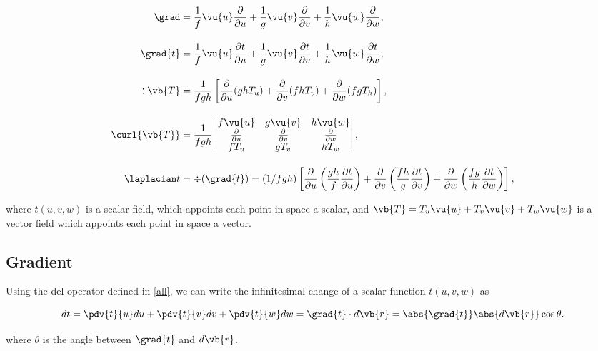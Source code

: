 \documentclass[english,a4paper,12pt]{report}
\begin{document}
\begin{equation} \label{all} 
\begin{aligned}
\grad &= \frac{1}{f}\vu{u}\frac{\partial}{\partial u} + \frac{1}{g}\vu{v}\frac{\partial}{\partial v} + \frac{1}{h}\vu{w}\frac{\partial}{\partial w}, \\[10pt]
\grad{t }&= \frac{1}{f} \vu{u} \frac{\partial t}{\partial u} 
+ \frac{1}{g} \vu{v}\frac{\partial t}{\partial v}  
+ \frac{1}{h} \vu{w}\frac{\partial t}{\partial w} , \\[10pt]
\div{\vb{T}}  &= \frac{1}{fgh} \left[ 
\frac{\partial}{\partial u} (ghT_{u} ) + 
\frac{\partial}{\partial v} (fhT_{v} )+ 
\frac{\partial}{\partial w} (fgT_{h} ) \right], \\[10pt]
\curl{\vb{T} }  &= \frac{1}{fgh} 
\begin{vmatrix} 
f \vu{u} & g \vu{v} & h \vu{w} \\ 
\frac{\partial}{\partial u} & \frac{\partial}{\partial v} & \frac{\partial}{\partial w} \\ 
fT_{u}  & g T_{v}  & h T_{w}  
\end{vmatrix}, \\[10pt]
\laplacian t &= \div{(\grad{t} )} =  (1 / fgh) \left[
\frac{\partial}{\partial u} \left( \frac{gh}{f} \frac{\partial t}{\partial u} \right) + 
\frac{\partial}{\partial v} \left( \frac{fh}{g} \frac{\partial t}{\partial v} \right) + 
\frac{\partial}{\partial w} \left( \frac{fg}{h} \frac{\partial t}{\partial w} \right)
\right],
\end{aligned}
\end{equation}

where \(t (u,v,w)\) is a scalar field, which appoints each point in space a scalar, and \(\vb{T} = T_{u}\vu{u} + T_{v}\vu{v} + T_{w}\vu{w} \) is a vector field which appoints each point in space a vector.  

\subsection{Gradient}
Using the del operator defined in \cref{all}, we can write the infinitesimal change of a scalar function \(t(u,v,w)\) as

\begin{equation}
    dt = \pdv{t}{u}du + \pdv{t}{v}dv + \pdv{t}{w}dw = \grad{t} \cdot d\vb{r}  = \abs{\grad{t} }\abs{d \vb{r} }\cos \theta   . \label{dt} 
\end{equation}

where \(\theta\) is the angle between \(\grad{t}\) and \(d\vb{r}\).
	
\end{document}
